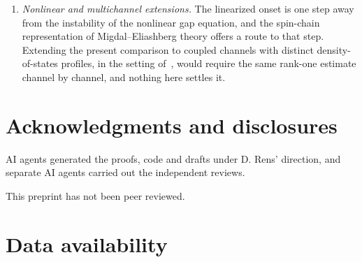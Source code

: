 \documentclass[11pt]{article}
\newcommand{\kb}{k_{\mathrm B}}
\newcommand{\Tlin}{T_{\mathrm{lin}}}
\theoremstyle{definition}
\theoremstyle{remark}
\begin{document}
\begin{enumerate}[label=(\arabic*),leftmargin=2.2em]
subtraction, so any pairing-only kernel that is positive semidefinite in the folded
stability form keeps $\kb\Tlin\le C(\lambda)\sqrt M$. A kernel that also modifies $Z$ does
not, and the common-cutoff optimality question for that class is not posed here.
\item \emph{Nonlinear and multichannel extensions.} The linearized onset is one step away
from the instability of the nonlinear gap equation, and the spin-chain representation of
Migdal--Eliashberg theory offers a route to that step. Extending the present comparison to
coupled channels with distinct density-of-states profiles, in the setting
of~\cite{univglue,optimum,anisosharp,capstone}, would require the same rank-one estimate
channel by channel, and nothing here settles it.
\end{enumerate}

\section*{Acknowledgments and disclosures}

AI agents generated the proofs, code and drafts under D. Rens' direction, and separate AI
agents carried out the independent reviews.

This preprint has not been peer reviewed.

\section*{Data availability}
\end{document}
